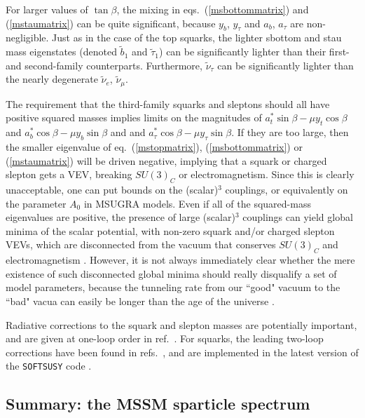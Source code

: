 \documentclass[12pt]{article}
\def\stilde{\widetilde}
\begin{document}
For larger values of $\tan\beta$, the mixing in 
eqs.~(\ref{msbottommatrix}) and (\ref{mstaumatrix}) can be quite 
significant, because $y_b$, $y_\tau$ and $a_b$, $a_\tau$ are 
non-negligible. Just as in the case of the top squarks, the lighter 
sbottom and stau mass eigenstates (denoted $\stilde b_1$ and $\stilde 
\tau_1$) can be significantly lighter than their first- and second-family 
counterparts. Furthermore, ${\stilde \nu_\tau}$ can be significantly 
lighter than the nearly degenerate ${\stilde \nu_e}$, $\stilde \nu_\mu$.

The requirement that the third-family squarks and sleptons should all have 
positive squared masses implies limits on the magnitudes of 
$a_t^*\sin\beta -\mu y_t \cos\beta$ and $a_b^*\cos\beta - \mu y_b 
\sin\beta$ and and $a_\tau^* \cos\beta - \mu y_\tau \sin\beta$. If they 
are too large, then the smaller eigenvalue of eq.~(\ref{mstopmatrix}), 
(\ref{msbottommatrix}) or (\ref{mstaumatrix}) will be driven negative, 
implying that a squark or charged slepton gets a VEV, breaking $SU(3)_C$ 
or electromagnetism. Since this is clearly unacceptable, one can put 
bounds on the (scalar)$^3$ couplings, or equivalently on the parameter 
$A_0$ in MSUGRA models. Even if all of the squared-mass 
eigenvalues are positive, the presence of large (scalar)$^3$ couplings can 
yield global minima of the scalar potential, with non-zero squark and/or 
charged slepton VEVs, which are disconnected from the vacuum that 
conserves $SU(3)_C$ and electromagnetism \cite{badvacua}. However, it is 
not always immediately clear whether the mere existence of such 
disconnected global minima should really disqualify a set of model
parameters, 
because the tunneling rate from our ``good" vacuum to the ``bad"  vacua 
can easily be longer than the age of the universe \cite{kusenko}.

Radiative corrections to the squark and slepton masses are potentially important, and are given at one-loop order in ref.~\cite{PBMZ}.
For squarks, the leading two-loop corrections have been found in 
refs.~\cite{Martin:2005eg,Martin:2006ub}, and are implemented in the latest
version of the {\tt SOFTSUSY} code \cite{SOFTSUSY}.

\subsection{Summary: the MSSM sparticle
spectrum}\label{subsec:MSSMspectrum.summary}
\setcounter{equation}{0}
\setcounter{footnote}{1}
\end{document}
